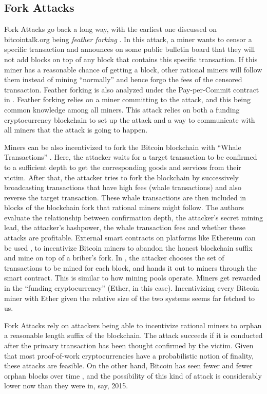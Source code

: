 \documentclass[runningheads]{llncs}
\begin{document}
\subsection{Fork Attacks}
Fork Attacks go back a long way, with the earliest one discussed on bitcointalk.org being \emph{feather forking} \cite{feather_forking}. In this attack, a miner wants to censor a specific transaction and announces on some public bulletin board that they will not add blocks on top of any block that contains this specific transaction. If this miner has a reasonable chance of getting a block, other rational miners will follow them instead of mining ``normally'' and hence forgo the fees of the censored transaction. Feather forking is also analyzed under the Pay-per-Commit contract in \cite{temporary_censorship_attack_ethereum}. Feather forking relies on a miner committing to the attack, and this being common knowledge among all miners. This attack relies on both a funding cryptocurrency blockchain to set up the attack and a way to communicate with all miners that the attack is going to happen.  

Miners can be also incentivized to fork the Bitcoin blockchain with ``Whale Transactions'' \cite{whale_transactions}. Here, the attacker waits for a target transaction to be confirmed to a sufficient depth to get the corresponding goods and services from their victim. After that, the attacker tries to fork the blockchain by successively broadcasting transactions that have high fees (whale transactions) and also reverse the target transaction. These whale transactions are then included in blocks of the blockchain fork that rational miners might follow. The authors evaluate the relationship between confirmation depth, the attacker's secret mining lead, the attacker's hashpower, the whale transaction fees and whether these attacks are profitable. External smart contracts on platforms like Ethereum can be used \cite{smart_contracts_for_bribing}, \cite{pay_to_win} to incentivize Bitcoin miners to abandon the honest blockchain suffix and mine on top of a briber's fork. In \cite{pay_to_win}, the attacker chooses the set of transactions to be mined for each block, and hands it out to miners through the smart contract. This is similar to how mining pools operate. Miners get rewarded in the ``funding cryptocurrency'' (Ether, in this case). Incentivizing every Bitcoin miner with Ether given the relative size of the two systems seems far fetched to us.

Fork Attacks rely on attackers being able to incentivize rational miners to orphan a reasonable length suffix of the blockchain. The attack succeeds if it is conducted after the primary transaction has been thought confirmed by the victim. Given that most proof-of-work cryptocurrencies have a probabilistic notion of finality, these attacks are feasible. On the other hand, Bitcoin has seen fewer and fewer orphan blocks over time \cite{orphans}, and the possibility of this kind of attack is considerably lower now than they were in, say, 2015. 
\end{document}
